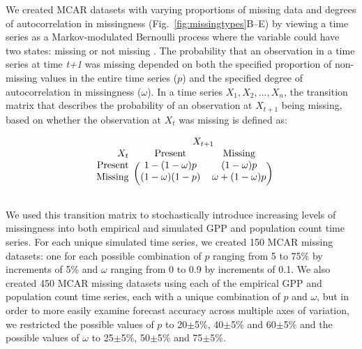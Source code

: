 \documentclass{article}
\begin{document}
We created MCAR datasets with varying proportions of missing data and degrees of autocorrelation in missingness (Fig.\ \ref{fig:missingtypes}B--E) by viewing a time series as a Markov-modulated Bernoulli process where the variable could have two states: missing or not missing \citep{Gharib2014, Edwards1960}. The probability that an observation in a time series at time \textit{t+1} was missing depended on both the specified proportion of non-missing values in the entire time series ($p$) and the specified degree of autocorrelation in missingness ($\omega$). In a time series $X_1, X_2, ..., X_n$, the transition matrix that describes the probability of an observation at $X_{t+1}$ being missing, based on whether the observation at $X_t$ was missing is defined as: 


\begin{equation}
\begin{blockarray}{rcccc}
\text{} & \BAmulticolumn{4}{c}{X_{t+1}}\\
X_t & \text{Present} & \text{Missing}  \\
\begin{block}{r(cccc)}
\text{Present} & 1-(1-\omega)p & (1-\omega)p \\
\text{Missing} & (1-\omega)(1-p) & \omega + (1-\omega)p  \\
[1ex]
\end{block}
\end{blockarray}
\end{equation}

\noindent We used this transition matrix to stochastically introduce increasing levels of missingness into both empirical and simulated GPP and population count time series. For each unique simulated time series, we created 150 MCAR missing datasets: one for each possible combination of $p$ ranging from 5 to 75\% by increments of 5\% and $\omega$ ranging from 0 to 0.9 by increments of 0.1. We also created 450 MCAR missing datasets using each of the empirical GPP and population count time series, each with a unique combination of $p$ and $\omega$, but in order to more easily examine forecast accuracy across multiple axes of variation, we restricted the possible values of $p$ to 20$\pm$5\%, 40$\pm$5\% and 60$\pm$5\% and the possible values of $\omega$ to 25$\pm$5\%, 50$\pm$5\% and 75$\pm$5\%.
\end{document}
